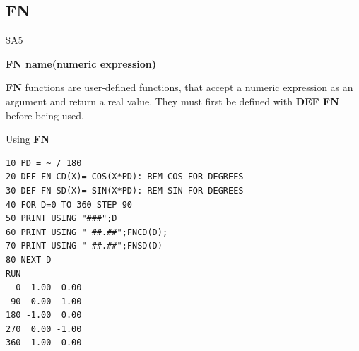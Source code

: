 \subsection{FN}
\begin{description}[leftmargin=2cm,style=nextline]
\item [Token:] \$A5
\item [Format:] {\bf FN name(numeric expression)}
\item [Usage:] {\bf FN} functions are user-defined
               functions, that accept a numeric expression as an
               argument and return a real value.
               They must first be defined with {\bf DEF FN} before
               being used.

\item [Example:] Using {\bf FN}
\begin{tcolorbox}[colback=black,coltext=white]
\verbatimfont{\codefont}
\begin{verbatim}
10 PD = ~ / 180
20 DEF FN CD(X)= COS(X*PD): REM COS FOR DEGREES
30 DEF FN SD(X)= SIN(X*PD): REM SIN FOR DEGREES
40 FOR D=0 TO 360 STEP 90
50 PRINT USING "###";D
60 PRINT USING " ##.##";FNCD(D);
70 PRINT USING " ##.##";FNSD(D)
80 NEXT D
RUN
  0  1.00  0.00
 90  0.00  1.00
180 -1.00  0.00
270  0.00 -1.00
360  1.00  0.00
\end{verbatim}
\end{tcolorbox}
\end{description}


\newpage
